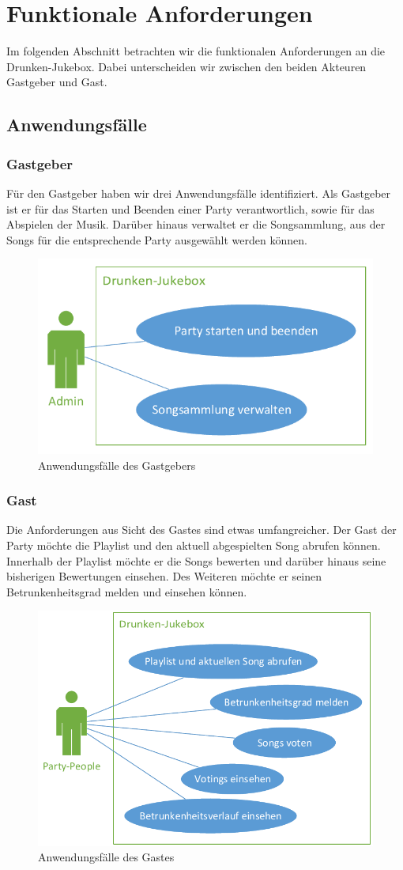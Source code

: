 \newpage
\section{Funktionale Anforderungen}
Im folgenden Abschnitt betrachten wir die funktionalen Anforderungen an die Drunken-Jukebox. Dabei unterscheiden wir zwischen den beiden Akteuren Gastgeber und Gast.

\subsection{Anwendungsfälle}
\subsubsection{Gastgeber}
Für den Gastgeber haben wir drei Anwendungsfälle identifiziert. Als Gastgeber ist er für das Starten und Beenden einer Party verantwortlich, sowie für das Abspielen der Musik. Darüber hinaus verwaltet er die Songsammlung, aus der Songs für die entsprechende Party ausgewählt werden können. 

\begin{figure}[H]
\centering
\includegraphics[width=0.75\linewidth]{Bilder/AdminUseCase}
\caption{Anwendungsfälle des Gastgebers}
\label{fig:AdminUseCase}
\end{figure}

\newpage
\subsubsection{Gast}
Die Anforderungen aus Sicht des Gastes sind etwas umfangreicher. Der Gast der Party möchte die Playlist und den aktuell abgespielten Song abrufen können. Innerhalb der Playlist möchte er die Songs bewerten und darüber hinaus seine bisherigen Bewertungen einsehen. Des Weiteren möchte er seinen Betrunkenheitsgrad melden und einsehen können.

\begin{figure}[H]
\centering
\includegraphics[width=0.95\linewidth]{Bilder/PartyPeopleUseCase}
\caption{Anwendungsfälle des Gastes}
\label{fig:PartyPeopleUseCase}
\end{figure}
